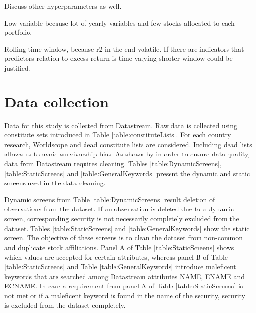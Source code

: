 \documentclass[12pt]{article}
\begin{document}
Discuss other hyperparameters as well.

Low variable because lot of yearly variables and few stocks allocated to each portfolio.

Rolling time window, because r2 in the end volatile. If there are indicators that predictors relation to excess return is time-varying shorter window could be justified.

\clearpage

\appendix
\section{Data collection}
\renewcommand{\thefigure}{A.\arabic{figure}}
\setcounter{figure}{0}
\renewcommand{\thetable}{A.\arabic{table}}
\setcounter{table}{0}

Data for this study is collected from Datastream. Raw data is collected using constitute sets introduced in Table \ref{table:constituteLists}. For each country research, Worldscope and dead constitute lists are considered. Including dead lists allows us to avoid survivorship bias. As shown by \citet{Ince2006} in order to ensure data quality, data from Datastream requires cleaning. Tables \ref{table:DynamicScreens}, \ref{table:StaticScreens} and \ref{table:GeneralKeywords} present the dynamic and static screens used in the data cleaning. \par

Dynamic screens from Table \ref{table:DynamicScreens} result deletion of observations from the dataset. If an observation is deleted due to a dynamic screen, corresponding security is not necessarily completely excluded from the dataset. Tables \ref{table:StaticScreens} and \ref{table:GeneralKeywords} show the static screen. The objective of these screens is to clean the dataset from non-common and duplicate stock affiliations. Panel A of Table \ref{table:StaticScreens} shows which values are accepted for certain attributes, whereas panel B of Table \ref{table:StaticScreens} and Table \ref{table:GeneralKeywords} introduce maleficent keywords that are searched among Datastream attributes NAME, ENAME and ECNAME. In case a requirement from panel A of Table \ref{table:StaticScreens} is not met or if a maleficent keyword is found in the name of the security, security is excluded from the dataset completely. \par
\end{document}

